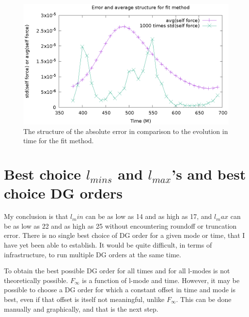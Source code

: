 \begin{figure}
  \includegraphics{structErrFitMethod}
  \caption{The structure of the absolute error in comparison to the evolution in time for the fit method.}
  \label{twopeaks}
\end{figure}


\section{Best choice $l_{mins}$ and $l_{max}$'s and best choice DG orders}

My conclusion is that $l_min$ can be as low as 14 and as high as 17, and $l_max$ can be as low as 22 and as high as 25 without encountering roundoff or truncation error. There is no single best choice of DG order for a given mode or time, that I have yet been able to establish. It would be quite difficult, in terms of infrastructure, to run multiple DG orders at the same time.

To obtain the best possible DG order for all times and for all l-modes is not theoretically possible. $F_\infty$ is a function of l-mode and time. However, it may be possible to choose a DG order for which a constant offset in time and mode is best, even if that offset is itself not meaningful, unlike $F_\infty$. This can be done manually and graphically, and that is the next step. 



